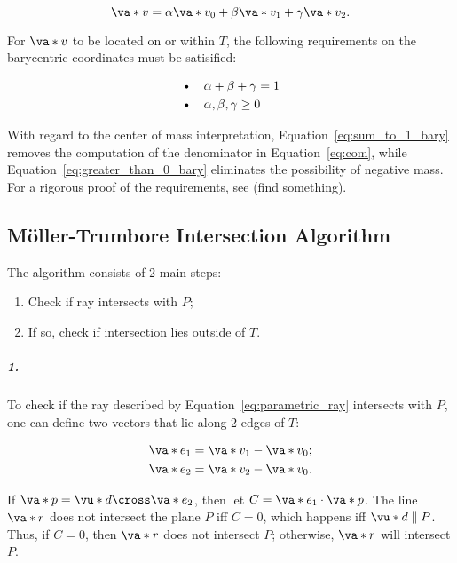 \begin{equation}
\va*{v} = \alpha \va*{v_0} + \beta \va*{v_1} + \gamma \va*{v_2}.
\label{eq:v_on_plane_bary}
\end{equation}

\noindent For $\va*{v}$ to be located on or within $T$, the following requirements on the barycentric coordinates must be satisified:

\begin{align}
  &\text{\textbullet}\quad \alpha + \beta + \gamma = 1 \label{eq:sum_to_1_bary}\\
  &\text{\textbullet}\quad \alpha, \beta, \gamma \geq 0 \label{eq:greater_than_0_bary}
\end{align}

With regard to the center of mass interpretation, Equation~\ref{eq:sum_to_1_bary} removes the computation of the denominator in Equation~\ref{eq:com}, while Equation~\ref{eq:greater_than_0_bary} eliminates the possibility of negative mass. For a rigorous proof of the requirements, see (find something).

\subsection{Möller-Trumbore Intersection Algorithm} \label{sec:ray_tri_alg}
\par The algorithm consists of 2 main steps:

\begin{enumerate}
  \item Check if ray intersects with $P$;
  \item If so, check if intersection lies outside of $T$.
\end{enumerate}

\subparagraph{1.}
\par To check if the ray described by Equation~\ref{eq:parametric_ray} intersects with $P$, one can define two vectors that lie along 2 edges of $T$:

\begin{align}
  \va*{e_1} &= \va*{v_1} - \va*{v_0} \label{eq:e_1_bary};\\
  \va*{e_2} &= \va*{v_2} - \va*{v_0} \label{eq:e_2_bary}.
\end{align}

\noindent If $\va*{p} = \vu*{d} \cross \va*{e_2}$, then let $C = \va*{e_1} \cdot \va*{p}$. The line $\va*{r}$ does not intersect the plane $P$ iff $C = 0$, which happens iff $\vu*{d} \parallel P$. Thus, if $C = 0$, then $\va*{r}$ does not intersect $P$; otherwise, $\va*{r}$ will intersect $P$.

